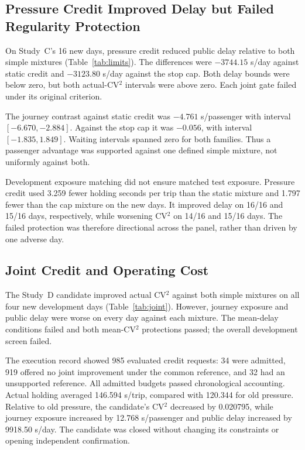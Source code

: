 \subsection{Pressure Credit Improved Delay but Failed Regularity Protection}

On Study~C's 16 new days, pressure credit reduced public delay relative to both simple mixtures (Table~\ref{tab:limits}). The differences were $-3744.15$ s/day against static credit and $-3123.80$ s/day against the stop cap. Both delay bounds were below zero, but both actual-CV$^2$ intervals were above zero. Each joint gate failed under its original criterion.

The journey contrast against static credit was $-4.761$ s/passenger with interval $[-6.670,-2.884]$. Against the stop cap it was $-0.056$, with interval $[-1.835,1.849]$. Waiting intervals spanned zero for both families. Thus a passenger advantage was supported against one defined simple mixture, not uniformly against both.

Development exposure matching did not ensure matched test exposure. Pressure credit used 3.259 fewer holding seconds per trip than the static mixture and 1.797 fewer than the cap mixture on the new days. It improved delay on 16/16 and 15/16 days, respectively, while worsening CV$^2$ on 14/16 and 15/16 days. The failed protection was therefore directional across the panel, rather than driven by one adverse day.

\subsection{Joint Credit and Operating Cost}

The Study~D candidate improved actual CV$^2$ against both simple mixtures on all four new development days (Table~\ref{tab:joint}). However, journey exposure and public delay were worse on every day against each mixture. The mean-delay conditions failed and both mean-CV$^2$ protections passed; the overall development screen failed.

The execution record showed 985 evaluated credit requests: 34 were admitted, 919 offered no joint improvement under the common reference, and 32 had an unsupported reference. All admitted budgets passed chronological accounting. Actual holding averaged 146.594 s/trip, compared with 120.344 for old pressure. Relative to old pressure, the candidate's CV$^2$ decreased by 0.020795, while journey exposure increased by 12.768 s/passenger and public delay increased by 9918.50 s/day. The candidate was closed without changing its constraints or opening independent confirmation.

